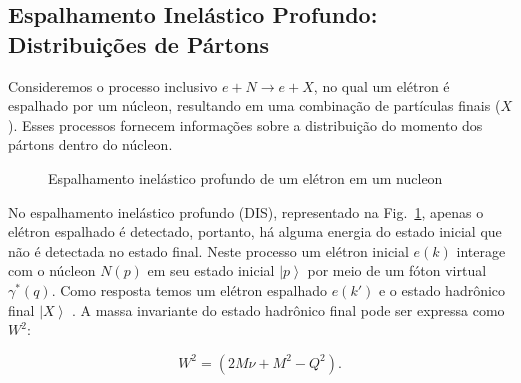\subsection{Espalhamento Inelástico Profundo: Distribuições de Pártons}


Consideremos o processo inclusivo \( e + N \rightarrow e + X \), no qual um elétron é espalhado por um núcleon, resultando em uma combinação de partículas finais (\( X \)). Esses processos fornecem informações sobre a distribuição do momento dos pártons dentro do núcleon.
\begin{figure}[h!]
    \centering
    \caption{Espalhamento inelástico profundo de um elétron em um nucleon }
    \label{fig:dis}
\end{figure}

No espalhamento inelástico profundo (DIS), representado na Fig.~\ref{fig:dis}, apenas o elétron espalhado é detectado, portanto, há alguma energia do estado inicial que não é detectada no estado final. Neste processo um elétron inicial \( e(k) \) interage com o núcleon $N(p)$ em seu estado inicial \( \left| p \right\rangle \) por meio de um fóton virtual \( \gamma^*(q) \). Como resposta temos um elétron espalhado \( e(k') \) e o estado hadrônico final \( \left| X \right\rangle \) . A massa invariante do estado hadrônico final pode ser expressa como \( W^2 \):

\begin{equation}
W^2 = (2M\nu + M^2 - Q^2). 
\end{equation}

